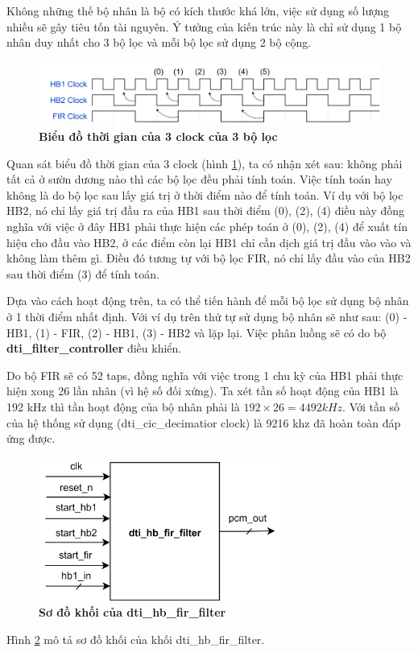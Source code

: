Không những thế bộ nhân là bộ có kích thước khá lớn, việc sử dụng số lượng nhiều sẽ gây tiêu tốn tài nguyên. Ý tưởng của kiến trúc này là chỉ sử dụng 1 bộ nhân duy nhất cho 3 bộ lọc và mỗi bộ lọc sử dụng 2 bộ cộng.

\begin{figure}[H]
    \centering
    \includegraphics[width=16cm]{Images/Chuong4/hb_fir/timing.png}
    \caption[Biểu đồ thời gian của 3 clock của 3 bộ lọc]{\bfseries \fontsize{12pt}{0pt}\selectfont Biểu đồ thời gian của 3 clock của 3 bộ lọc}
    \label{3clock}
\end{figure}

Quan sát biểu đồ thời gian của 3 clock (hình \ref{3clock}), ta có nhận xét sau: không phải tất cả ở sườn dương nào thì các bộ lọc đều phải tính toán. Việc tính toán hay không là do bộ lọc sau lấy giá trị ở thời điểm nào để tính toán. Ví dụ với bộ lọc HB2, nó chỉ lấy giá trị đầu ra của HB1 sau thời điểm (0), (2), (4) điều này đồng nghĩa với việc ở đây HB1 phải thực hiện các phép toán ở (0), (2), (4) để xuất tín hiệu cho đầu vào HB2, ở các điểm còn lại HB1 chỉ cần dịch giá trị đầu vào vào và không làm thêm gì. Điều đó tương tự với bộ lọc FIR, nó chỉ lấy đầu vào của HB2  sau thời điểm (3) để tính toán.

Dựa vào cách hoạt động trên, ta có thể tiến hành để mỗi bộ lọc sử dụng bộ nhân ở 1 thời điểm nhất định. Với ví dụ trên thứ tự sử dụng bộ nhân sẽ như sau: (0) - HB1, (1) - FIR, (2) - HB1, (3) - HB2 và lặp lại. Việc phân luồng sẽ có do bộ \textbf{dti\_filter\_controller} điều khiển.

Do bộ FIR sẽ có 52 taps, đồng nghĩa với việc trong 1 chu kỳ của HB1 phải thực hiện xong 26 lần nhân (vì hệ số đối xứng). Ta xét tần số hoạt động của HB1 là 192 kHz thì tần hoạt động của bộ nhân phải là $192 \times 26 = 4492 kHz$. Với tần số của hệ thống sử dụng (dti\_cic\_decimatior clock) là 9216 khz đã hoàn toàn đáp ứng được.

\begin{figure}[H]
    \centering
    \includegraphics[width=8cm]{Images/Chuong4/hb_fir/hb_fir_top.png}
    \caption[Sơ đồ khối của dti\_cic\_decimator]{\bfseries \fontsize{12pt}{0pt}\selectfont Sơ đồ khối của dti\_hb\_fir\_filter}
    \label{hb_fir_top}
\end{figure}
Hình \ref{hb_fir_top} mô tả sơ đồ khối của khối dti\_hb\_fir\_filter.

